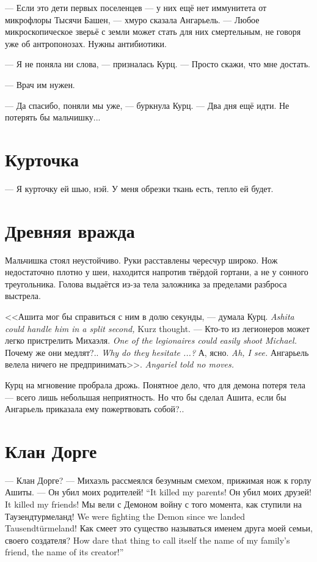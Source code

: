 --- Если это дети первых поселенцев --- у них ещё нет иммунитета от микрофлоры Тысячи Башен, --- хмуро сказала Ангарьель.
--- Любое микроскопическое зверьё с земли может стать для них смертельным, не говоря уже об антропонозах.
Нужны антибиотики.

--- Я не поняла ни слова, --- призналась Курц.
--- Просто скажи, что мне достать.

--- Врач им нужен.

--- Да спасибо, поняли мы уже, --- буркнула Курц.
--- Два дня ещё идти.
Не потерять бы мальчишку...

\section{Курточка}

--- Я курточку ей шью, нэй.
У меня обрезки ткань есть, тепло ей будет.

\section{Древняя вражда}

Мальчишка стоял неустойчиво.
Руки расставлены чересчур широко.
Нож недостаточно плотно у шеи, находится напротив твёрдой гортани, а не у сонного треугольника.
Голова выдаётся из-за тела заложника за пределами разброса выстрела.

{<<Ашита мог бы справиться с ним в долю секунды, --- думала Курц.}
{\textit{Ashita could handle him in a split second,} Kurz thought.}
{--- Кто-то из легионеров может легко пристрелить Михаэля.}
{\textit{One of the legionaires could easily shoot Michael.}}
{Почему же они медлят?..}
{\textit{Why do they hesitate ...?}}
{А, ясно.}
{\textit{Ah, I see.}}
{Ангарьель велела ничего не предпринимать>>.}
{\textit{Angariel told no moves.}}

Курц на мгновение пробрала дрожь.
Понятное дело, что для демона потеря тела --- всего лишь небольшая неприятность.
Но что бы сделал Ашита, если бы Ангарьель приказала ему пожертвовать собой?..

\section{Клан Дорге}

--- Клан Дорге? --- Михаэль рассмеялся безумным смехом, прижимая нож к горлу Ашиты.
{--- Он убил моих родителей!}
{``It killed my parents!}
{Он убил моих друзей!}
{It killed my friends!}
{Мы вели с Демоном войну с того момента, как ступили на Таузендтурмеланд!}
{We were fighting the Demon since we landed Tausendt\"{u}rmeland!}
{Как смеет это существо называться именем друга моей семьи, своего создателя?}
{How dare that thing to call itself the name of my family's friend, the name of its creator!''}

